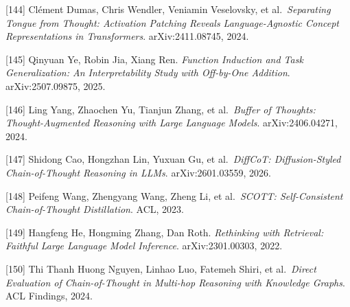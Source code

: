 {[}144{]} Clément Dumas, Chris Wendler, Veniamin Veselovsky, et al.~\emph{Separating Tongue from Thought: Activation Patching Reveals Language-Agnostic Concept Representations in Transformers}. arXiv:2411.08745, 2024.

{[}145{]} Qinyuan Ye, Robin Jia, Xiang Ren. \emph{Function Induction and Task Generalization: An Interpretability Study with Off-by-One Addition}. arXiv:2507.09875, 2025.

{[}146{]} Ling Yang, Zhaochen Yu, Tianjun Zhang, et al.~\emph{Buffer of Thoughts: Thought-Augmented Reasoning with Large Language Models}. arXiv:2406.04271, 2024.

{[}147{]} Shidong Cao, Hongzhan Lin, Yuxuan Gu, et al.~\emph{DiffCoT: Diffusion-Styled Chain-of-Thought Reasoning in LLMs}. arXiv:2601.03559, 2026.

{[}148{]} Peifeng Wang, Zhengyang Wang, Zheng Li, et al.~\emph{SCOTT: Self-Consistent Chain-of-Thought Distillation}. ACL, 2023.

{[}149{]} Hangfeng He, Hongming Zhang, Dan Roth. \emph{Rethinking with Retrieval: Faithful Large Language Model Inference}. arXiv:2301.00303, 2022.

{[}150{]} Thi Thanh Huong Nguyen, Linhao Luo, Fatemeh Shiri, et al.~\emph{Direct Evaluation of Chain-of-Thought in Multi-hop Reasoning with Knowledge Graphs}. ACL Findings, 2024.

